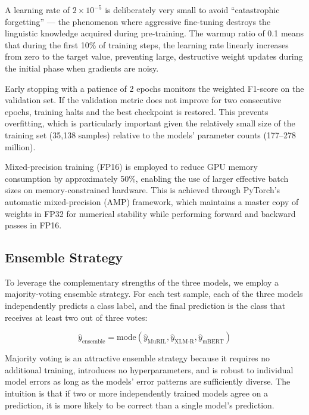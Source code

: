 \documentclass[12pt, a4paper]{article}
\begin{document}
A learning rate of $2 \times 10^{-5}$ is deliberately very small to avoid ``catastrophic forgetting'' --- the phenomenon where aggressive fine-tuning destroys the linguistic knowledge acquired during pre-training. The warmup ratio of 0.1 means that during the first 10\% of training steps, the learning rate linearly increases from zero to the target value, preventing large, destructive weight updates during the initial phase when gradients are noisy.

Early stopping with a patience of 2 epochs monitors the weighted F1-score on the validation set. If the validation metric does not improve for two consecutive epochs, training halts and the best checkpoint is restored. This prevents overfitting, which is particularly important given the relatively small size of the training set (35,138 samples) relative to the models' parameter counts (177--278 million).

Mixed-precision training (FP16) is employed to reduce GPU memory consumption by approximately 50\%, enabling the use of larger effective batch sizes on memory-constrained hardware. This is achieved through PyTorch's automatic mixed-precision (AMP) framework, which maintains a master copy of weights in FP32 for numerical stability while performing forward and backward passes in FP16.

\subsection{Ensemble Strategy}

To leverage the complementary strengths of the three models, we employ a majority-voting ensemble strategy. For each test sample, each of the three models independently predicts a class label, and the final prediction is the class that receives at least two out of three votes:

\begin{equation}
\hat{y}_{\text{ensemble}} = \text{mode}\left(\hat{y}_{\text{MuRIL}}, \hat{y}_{\text{XLM-R}}, \hat{y}_{\text{mBERT}}\right)
\label{eq:ensemble}
\end{equation}

Majority voting is an attractive ensemble strategy because it requires no additional training, introduces no hyperparameters, and is robust to individual model errors as long as the models' error patterns are sufficiently diverse. The intuition is that if two or more independently trained models agree on a prediction, it is more likely to be correct than a single model's prediction.
\end{document}
